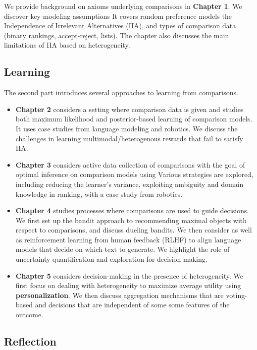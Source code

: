 \documentclass[
  letterpaper,
  numbers=noenddot,
  DIV=11]{scrreprt}
\theoremstyle{plain}
\theoremstyle{definition}
\theoremstyle{remark}
\begin{document}
We provide background on axioms underlying comparisons in
\textbf{Chapter 1}. We discover key modeling assumptions It covers
random preference models the Independence of Irrelevant Alternatives
(IIA), and types of comparison data (binary rankings, accept-reject,
lists). The chapter also discusses the main limitations of IIA based on
heterogeneity.

\subsection*{Learning}\label{learning}

The second part introduces several approaches to learning from
comparisons.

\begin{itemize}
\item
  \textbf{Chapter 2} considers a setting where comparison data is given
  and studies both maximum likelihood and posterior-based learning of
  comparison models. It uses case studies from language modeling and
  robotics. We discuss the challenges in learning
  multimodal/heterogenous rewards that fail to satisfy IIA.
\item
  \textbf{Chapter 3} considers active data collection of comparisons
  with the goal of optimal inference on comparison models using Various
  strategies are explored, including reducing the learner's variance,
  exploiting ambiguity and domain knowledge in ranking, with a case
  study from robotics.
\item
  \textbf{Chapter 4} studies processes where comparisons are used to
  guide decisions. We first set up the bandit approach to recommending
  maximal objects with respect to comparisons, and discuss dueling
  bandits. We then consider as well as reinforcement learning from human
  feedback (RLHF) to align language models that decide on which text to
  generate. We highlight the role of uncertainty quantification and
  exploration for decision-making.
\item
  \textbf{Chapter 5} considers decision-making in the presence of
  heterogeneity. We first focus on dealing with heterogeneity to
  maximize average utility using \textbf{personalization}. We then
  discuss aggregation mechanisms that are voting-based and decisions
  that are independent of some some features of the outcome.
\end{itemize}

\subsection*{Reflection}\label{reflection}
\end{document}
